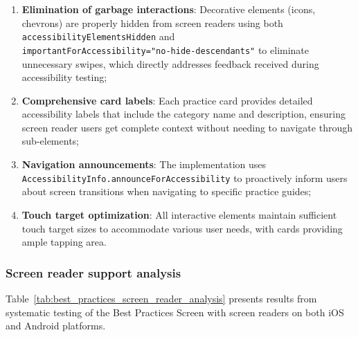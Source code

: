 \begin{enumerate}
    \item \textbf{Elimination of garbage interactions}: Decorative elements (icons, chevrons) are properly hidden from screen readers using both \texttt{accessibilityElementsHidden} and \\ \texttt{importantForAccessibility="no-hide-descendants"} to eliminate unnecessary swipes, which directly addresses feedback received during accessibility testing;
    
    \item \textbf{Comprehensive card labels}: Each practice card provides detailed accessibility labels that include the category name and description, ensuring screen reader users get complete context without needing to navigate through sub-elements;
    
    \item \textbf{Navigation announcements}: The implementation uses \\ \texttt{AccessibilityInfo.announceForAccessibility} to proactively inform users about screen transitions when navigating to specific practice guides;
    
    \item \textbf{Touch target optimization}: All interactive elements maintain sufficient touch target sizes to accommodate various user needs, with cards providing ample tapping area.
\end{enumerate}

\subsubsection{Screen reader support analysis}

Table~\ref{tab:best_practices_screen_reader_analysis} presents results from systematic testing of the Best Practices Screen with screen readers on both iOS and Android platforms.

